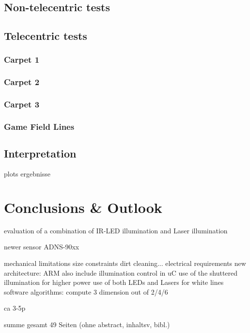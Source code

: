 \documentclass[12pt,a4paper]{article}
\begin{document}
\subsection{Non-telecentric tests}

\subsection{Telecentric tests}

\subsubsection{Carpet 1}

\subsubsection{Carpet 2}

\subsubsection{Carpet 3}

\subsubsection{Game Field Lines}

\subsection{Interpretation}

  plots
  ergebnisse

\section{Conclusions \& Outlook}

  evaluation of a combination of IR-LED illumination and Laser illumination

  newer sensor ADNS-90xx

  mechanical limitations
    size constraints
    dirt cleaning...
  electrical requirements
    new architecture: ARM
    also include illumination control in uC
      use of the shuttered illumination for higher power 
      use of both LEDs and Lasers for white lines
  software algorithms: compute 3 dimension out of 2/4/6

ca 3-5p


summe gesamt 49 Seiten (ohne abstract, inhaltsv, bibl.)


\label{Bibliography}


%
\end{document}
